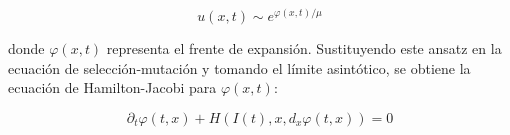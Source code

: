 {            \begin{equation*}
                u(x, t) \sim e^{\varphi(x, t)/\mu}
            \end{equation*}
                
            \normalsize{donde $\varphi(x,t)$ representa el frente de expansión. Sustituyendo este ansatz en la ecuación de selección-mutación y tomando el límite asintótico, se obtiene la ecuación de Hamilton-Jacobi para \( \varphi(x, t) \):}

            \begin{equation*}
                \partial_t \varphi(t, x)+H\left(I(t), x, d_x \varphi(t, x)\right)=0
            \end{equation*}
            
            }
